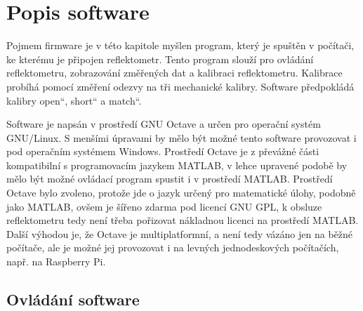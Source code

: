\chapter{Popis software}

Pojmem firmware je v této kapitole myšlen program, který je spuštěn v počítači, ke kterému je připojen reflektometr. Tento program slouží pro ovládání reflektometru, zobrazování změřených dat a kalibraci reflektometru. Kalibrace probíhá pomocí změření odezvy na tři mechanické kalibry. Software předpokládá kalibry \quotedblbase open\textquotedblleft, \quotedblbase short\textquotedblleft{} a \quotedblbase match\textquotedblleft{}.

Software je napsán v prostředí GNU Octave a určen pro operační systém GNU/Linux. S menšími úpravami by mělo být možné tento software provozovat i pod operačním systémem Windows. Prostředí Octave je z převážné části kompatibilní s programovacím jazykem MATLAB, v lehce upravené podobě by mělo být možné ovládací program spustit i  v prostředí MATLAB. Prostředí Octave bylo zvoleno, protože jde o jazyk určený pro matematické úlohy, podobně jako MATLAB, ovšem je šířeno zdarma pod licencí GNU GPL, k obsluze reflektometru tedy není třeba pořizovat nákladnou licenci na prostředí MATLAB. Další výhodou je, že Octave je multiplatformní, a není tedy vázáno jen na běžné počítače, ale je možné jej provozovat i na levných jednodeskových počítačích, např. na Raspberry Pi.

\section{Ovládání software}

